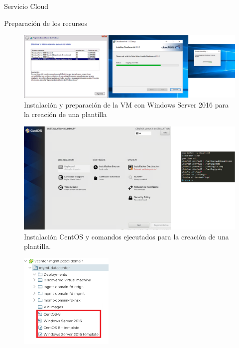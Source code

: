 \begin{subsection}{Servicio Cloud}
\begin{subsubsection}{Preparación de los recursos}
    \begin{figure}[h]
        \centering
        \includegraphics[width=1\textwidth]{imaxes/pruebaconcepto/vrealize/instalador-windows.png}
        \caption{Instalación y preparación de la VM con Windows Server 2016 para la creación de una plantilla}
        \label{fig:windows-server-installing}
    \end{figure}
    \FloatBarrier
    \begin{figure}[h]
        \centering
        \includegraphics[width=1\textwidth]{imaxes/pruebaconcepto/vrealize/centos-installation.png}
        \caption{Instalación CentOS y comandos ejecutados para la creación de una plantilla.}
        \label{fig:centos-installing}
    \end{figure}
    \FloatBarrier
    \begin{figure}[h]
        \centering
        \includegraphics[width=0.4\textwidth]{imaxes/pruebaconcepto/vrealize/plantillas-creadas-vcenter.png}

\end{figure}
\end{subsubsection}
\end{subsection}
